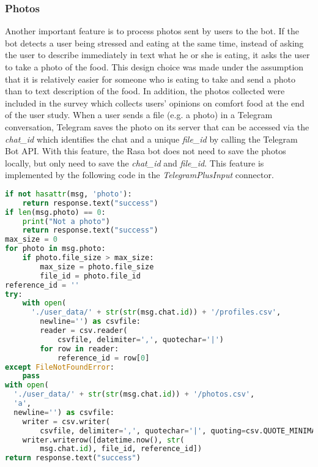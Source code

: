 \subsubsection{Photos}
Another important feature is to process photos sent by users to the bot. If the bot detects a user being stressed and eating at the same time, instead of asking the user to describe immediately in text what he or she is eating, it asks the user to take a photo of the food. This design choice was made under the assumption that it is relatively easier for someone who is eating to take and send a photo than to text description of the food. In addition, the photos collected were included in the survey which collects users' opinions on comfort food at the end of the user study. When a user sends a file (e.g. a photo) in a Telegram conversation, Telegram saves the photo on its server that can be accessed via the \emph{chat\_id} which identifies the chat and a unique \emph{file\_id} by calling the Telegram Bot API. With this feature, the Rasa bot does not need to save the photos locally, but only need to save the \emph{chat\_id} and \emph{file\_id}. This feature is implemented by the following code in the \emph{TelegramPlusInput} connector. \bigskip

\begin{lstlisting}[language=Python]
if not hasattr(msg, 'photo'):
    return response.text("success")
if len(msg.photo) == 0:
    print("Not a photo")
    return response.text("success")
max_size = 0
for photo in msg.photo:
    if photo.file_size > max_size:
        max_size = photo.file_size
        file_id = photo.file_id
reference_id = ''
try:
    with open(
      './user_data/' + str(str(msg.chat.id)) + '/profiles.csv',
        newline='') as csvfile:
        reader = csv.reader(
            csvfile, delimiter=',', quotechar='|')
        for row in reader:
            reference_id = row[0]
except FileNotFoundError:
    pass
with open(
  './user_data/' + str(str(msg.chat.id)) + '/photos.csv',
  'a',
  newline='') as csvfile:
    writer = csv.writer(
        csvfile, delimiter=',', quotechar='|', quoting=csv.QUOTE_MINIMAL)
    writer.writerow([datetime.now(), str(
        msg.chat.id), file_id, reference_id])
return response.text("success")
\end{lstlisting}


